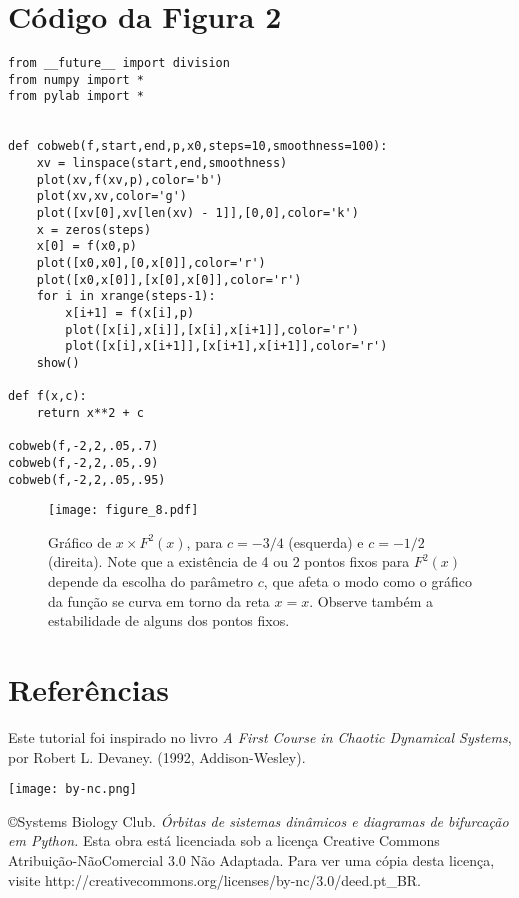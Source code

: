 \documentclass{article}
\begin{document}
\section*{Código da Figura 2}
\begin{verbatim}
from __future__ import division
from numpy import *
from pylab import *


def cobweb(f,start,end,p,x0,steps=10,smoothness=100):
    xv = linspace(start,end,smoothness)
    plot(xv,f(xv,p),color='b')
    plot(xv,xv,color='g')
    plot([xv[0],xv[len(xv) - 1]],[0,0],color='k')
    x = zeros(steps)
    x[0] = f(x0,p)
    plot([x0,x0],[0,x[0]],color='r')
    plot([x0,x[0]],[x[0],x[0]],color='r')
    for i in xrange(steps-1):
        x[i+1] = f(x[i],p)
        plot([x[i],x[i]],[x[i],x[i+1]],color='r')
        plot([x[i],x[i+1]],[x[i+1],x[i+1]],color='r')
    show()    
 
def f(x,c):
    return x**2 + c
  
cobweb(f,-2,2,.05,.7)
cobweb(f,-2,2,.05,.9)
cobweb(f,-2,2,.05,.95)
\end{verbatim}

\begin{figure}[h!]
\centering
\texttt{[image: figure\_8.pdf]}
\caption{Gráfico de $x \times F^2(x)$, para $c = -3/4$ (esquerda) e $c = -1/2$ (direita). Note que a existência de 4 ou 2 pontos fixos para $F^2(x)$ depende da escolha do parâmetro $c$, que afeta o modo como o gráfico da função se curva em torno da reta $x = x$. Observe também a estabilidade de alguns dos pontos fixos. }
\label{fig7}
\end{figure}

\section*{Referências}
Este tutorial foi inspirado no livro \emph{A First Course in Chaotic Dynamical Systems}, por Robert L. Devaney. (1992, Addison-Wesley). \\

\begin{minipage}{.15\textwidth}
\texttt{[image: by-nc.png]}
\end{minipage}
\begin{minipage}{.9\textwidth}
\copyright Systems Biology Club. \emph{Órbitas de sistemas dinâmicos e diagramas de bifurcação em Python.} Esta obra está licenciada sob a licença Creative Commons Atribuição-NãoComercial 3.0 Não Adaptada. Para ver uma cópia desta licença, visite \mbox{http://creativecommons.org/licenses/by-nc/3.0/deed.pt\_BR}.
\end{minipage}
 
\end{document}
